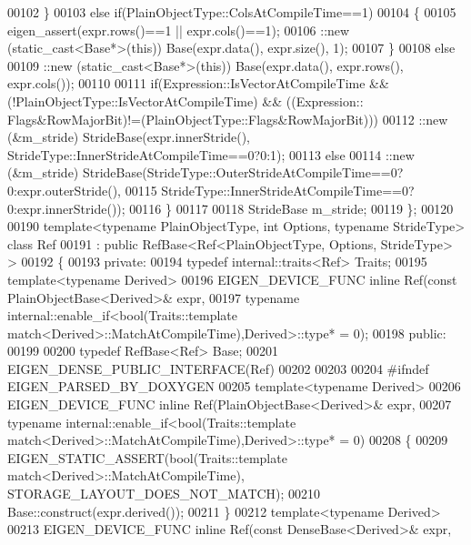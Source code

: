 \begin{DoxyCode}
00102     \}
00103     else if(PlainObjectType::ColsAtCompileTime==1)
00104     \{
00105       eigen\_assert(expr.rows()==1 || expr.cols()==1);
00106       ::new (static\_cast<Base*>(\textcolor{keyword}{this})) Base(expr.data(), expr.size(), 1);
00107     \}
00108     else
00109       ::new (static\_cast<Base*>(this)) Base(expr.data(), expr.rows(), expr.cols());
00110     
00111     if(Expression::IsVectorAtCompileTime && (!PlainObjectType::IsVectorAtCompileTime) && ((Expression::
      Flags&RowMajorBit)!=(PlainObjectType::Flags&RowMajorBit)))
00112       ::new (&m\_stride) StrideBase(expr.innerStride(), StrideType::InnerStrideAtCompileTime==0?0:1);
00113     else
00114       ::new (&m\_stride) StrideBase(StrideType::OuterStrideAtCompileTime==0?0:expr.outerStride(),
00115                                    StrideType::InnerStrideAtCompileTime==0?0:expr.innerStride());    
00116   \}
00117 
00118   StrideBase m\_stride;
00119 \};
00120 
00190 template<typename PlainObjectType, \textcolor{keywordtype}{int} Options, typename StrideType> class Ref
00191   : public RefBase<Ref<PlainObjectType, Options, StrideType> >
00192 \{
00193   \textcolor{keyword}{private}:
00194     \textcolor{keyword}{typedef} internal::traits<Ref> Traits;
00195     \textcolor{keyword}{template}<\textcolor{keyword}{typename} Derived>
00196     EIGEN\_DEVICE\_FUNC \textcolor{keyword}{inline} Ref(\textcolor{keyword}{const} PlainObjectBase<Derived>& expr,
00197                                  \textcolor{keyword}{typename} internal::enable\_if<\textcolor{keywordtype}{bool}(Traits::template 
      match<Derived>::MatchAtCompileTime),Derived>::type* = 0);
00198   \textcolor{keyword}{public}:
00199 
00200     \textcolor{keyword}{typedef} RefBase<Ref> Base;
00201     EIGEN\_DENSE\_PUBLIC\_INTERFACE(Ref)
00202 
00203 
00204     \textcolor{preprocessor}{#ifndef EIGEN\_PARSED\_BY\_DOXYGEN}
00205     \textcolor{keyword}{template}<\textcolor{keyword}{typename} Derived>
00206     EIGEN\_DEVICE\_FUNC \textcolor{keyword}{inline} Ref(PlainObjectBase<Derived>& expr,
00207                                  \textcolor{keyword}{typename} internal::enable\_if<\textcolor{keywordtype}{bool}(Traits::template 
      match<Derived>::MatchAtCompileTime),Derived>::type* = 0)
00208     \{
00209       EIGEN\_STATIC\_ASSERT(\textcolor{keywordtype}{bool}(Traits::template match<Derived>::MatchAtCompileTime), 
      STORAGE\_LAYOUT\_DOES\_NOT\_MATCH);
00210       Base::construct(expr.derived());
00211     \}
00212     \textcolor{keyword}{template}<\textcolor{keyword}{typename} Derived>
00213     EIGEN\_DEVICE\_FUNC \textcolor{keyword}{inline} Ref(\textcolor{keyword}{const} DenseBase<Derived>& expr,

\end{DoxyCode}
